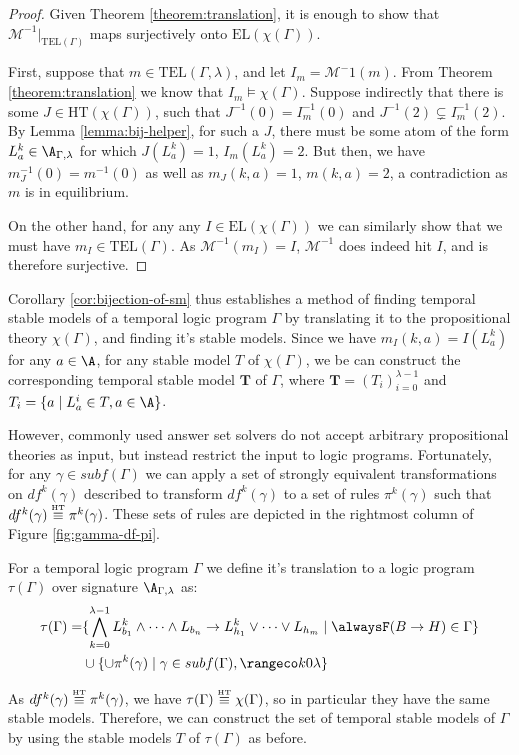 \begin{proof}
  Given Theorem \ref{theorem:translation}, it is enough to show that
  $\mathcal{M}^{-1}\vert_{\text{TEL}(\Gamma)}$ maps surjectively onto
  $\text{EL}(\chi(\Gamma))$.

  First, suppose that $m \in \text{TEL}(\Gamma,\lambda)$, and let
  $I_m = \mathcal{M}^-1(m)$. From Theorem \ref{theorem:translation} we
  know that $I_m \models \chi(\Gamma)$. Suppose indirectly that there
  is some $J \in \text{HT}(\chi(\Gamma))$, such that
  $J^{-1}(0) = I_m^{-1}(0)$ and $J^{-1}(2) \subsetneq I_m^{-1}(2)$. By
  Lemma \ref{lemma:bij-helper}, for such a $J$, there must be some
  atom of the form $L_{a}^k \in \A_{\Gamma,\lambda}$ for which
  $J(L_{a}^k)=1$, $I_m(L_a^k)=2$. But then, we have
  $m_J^{-1}(0) = m^{-1}(0)$ as well as $m_J(k,a) = 1$, $m(k,a) = 2$, a
  contradiction as $m$ is in equilibrium.

  On the other hand, for any any $I \in \text{EL}(\chi(\Gamma))$ we
  can similarly show that we must have $m_I \in \text{TEL}(\Gamma)$.
  As $\mathcal{M}^{-1}(m_I) = I$, $\mathcal{M}^{-1}$ does indeed hit
  $I$, and is therefore surjective.
\end{proof}

Corollary \ref{cor:bijection-of-sm} thus establishes a method of
finding temporal stable models of a temporal logic program $\Gamma$ by
translating it to the propositional theory $\chi(\Gamma)$, and finding
it's stable models. Since we have $m_I(k,a)=I(L_a^k)$ for any
$a\in \A$, for any stable model $T$ of $\chi(\Gamma)$, we be can
construct the corresponding temporal stable model $\bm{T}$ of
$\Gamma$, where $\bm{T} = (T_i)_{i=0}^{\lambda - 1}$ and
$T_i = \{ a \mid L^i_{a} \in T, a \in \A \}$.

However, commonly used answer set solvers do not accept arbitrary
propositional theories as input, but instead restrict the input to
logic programs. Fortunately, for any $\gamma \in subf(\Gamma)$ we can
apply a set of strongly equivalent transformations on $df^k(\gamma)$
described \cite{capeva05a} to transform $df^k(\gamma)$ to a set of
rules $\pi^k(\gamma)$ such that $df^k(\gamma) \stackrel{\normalfont\mbox{\tiny HT}}{\equiv}
\pi^k(\gamma)$. These sets of rules are depicted in the rightmost
column of Figure \ref{fig:gamma-df-pi}.

For a temporal logic program $\Gamma$ we define it's translation to a logic
program $\tau(\Gamma)$ over signature $\A_{\Gamma,\lambda}$ as:
\begin{align*}
  \tau(\Gamma)  = &\{ \bigwedge_{k=0}^{\lambda-1} L_{b_1}^k \land \dots \land L_{b_n}
                    \rightarrow L_{h_1}^k \lor \dots \lor L_{h_m} \mid \tempruleshort \in \Gamma \} \\
                  & \cup \{ \cup \pi^k(\gamma) \mid \gamma \in subf(\Gamma), \kinlambda \}
\end{align*}

As $df^k(\gamma) \stackrel{\normalfont\mbox{\tiny HT}}{\equiv} \pi^k(\gamma)$, we have
$\tau(\Gamma) \stackrel{\normalfont\mbox{\tiny HT}}{\equiv} \chi(\Gamma)$, so in particular they have the
same stable models. Therefore, we can construct the set of temporal
stable models of $\Gamma$ by using the stable models $T$ of
$\tau(\Gamma)$ as before.
